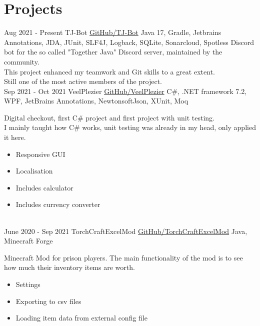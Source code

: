 \documentclass[letterpaper]{twentysecondcv} %
\begin{document}
    \section{Projects}
    \begin{twenty} %
        \twentyitem
        {Aug 2021 -}
        {Present}
        {TJ-Bot}
        {\href{https://github.com/Together-Java/TJ-Bot/}{GitHub/TJ-Bot}}
        {Java 17, Gradle, Jetbrains Annotations, JDA, JUnit, SLF4J, Logback, SQLite, Sonarcloud, Spotless}
        {
            Discord bot for the so called "Together Java" Discord server, maintained by the community.\\
        This project enhanced my teamwork and Git skills to a great extent.\\
        Still one of the most active members of the project.
        }\\

        \twentyitem
        {Sep 2021 -}
        {Oct 2021}
        {VeelPlezier}
        {\href{https://github.com/Tais993/VeelPlezier}{GitHub/VeelPlezier}}
        {C\#, .NET framework 7.2, WPF, JetBrains Annotations, NewtonsoftJson, XUnit, Moq}
        {
            Digital checkout, first C\# project and first project with unit testing.\\
        I mainly taught how C\# works, unit testing was already in my head, only applied it here.

            \begin{itemize}
                \item Responsive GUI
                \item Localisation
                \item Includes calculator
                \item Includes currency converter
            \end{itemize}
        }\\

        \twentyitem
        {June 2020 -}
        {Sep 2021}
        {TorchCraftExcelMod}
        {\href{https://github.com/Tais993/TorchCraftExcelMod}{GitHub/TorchCraftExcelMod}}
        {Java, Minecraft Forge}
        {
            Minecraft Mod for prison players.
            The main functionality of the mod is to see how much their inventory items are worth.
            \begin{itemize}
                \item Settings
                \item Exporting to csv files
                \item Loading item data from external config file
            \end{itemize}
        }\\
    \end{twenty}
\end{document}
